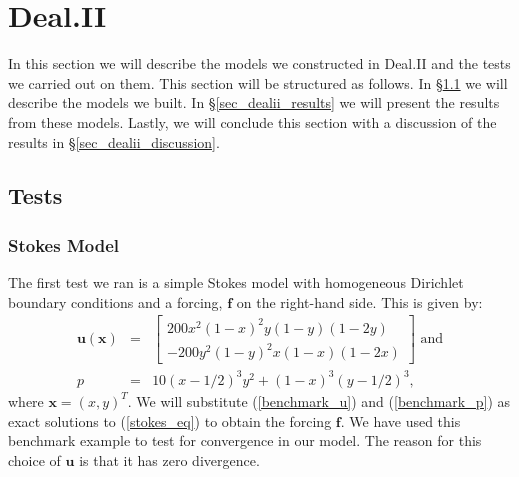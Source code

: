 \documentclass[12pt,a4paper]{article}
\theoremstyle{definition}
\begin{document}
\section{Deal.II}\label{sec_numerics}
In this section we will describe the models we constructed in Deal.II and the tests we carried out on them.  This section will be structured as follows.  In  \S \ref{sec_dealii_tests} we will describe the models we built.  In \S \ref{sec_dealii_results} we will present the results from these models.  Lastly, we will conclude this section with a discussion of the results in \S \ref{sec_dealii_discussion}.  
\subsection{Tests}\label{sec_dealii_tests}
\subsubsection{Stokes Model}\label{sec_test_stokes}
The first test we ran is a simple Stokes model with homogeneous Dirichlet boundary conditions and a forcing, $\textbf{f}$ on the right-hand side.  This is given by:
\begin{eqnarray}
\label{benchmark_u}
\textbf{u}\left(\textbf{x}\right)&=&\begin{bmatrix}
200x^2\left(1-x\right)^2y\left(1-y\right)\left(1-2y\right)  \\
-200y^2\left(1-y\right)^2x\left(1-x\right)\left(1-2x\right)  
\end{bmatrix} \text{ and}\\\label{benchmark_p}
p &=& 10\left(x-1/2\right)^3y^2+\left(1-x\right)^3\left(y-1/2\right)^3,
\end{eqnarray}
where $\textbf{x}=\left(x,y\right)^T$.    We will substitute (\ref{benchmark_u}) and (\ref{benchmark_p}) as exact solutions to (\ref{stokes_eq}) to obtain the forcing $\textbf{f}$.  We have used this benchmark example to test for convergence in our model.  The reason for this choice of $\textbf{u}$ is that it has zero divergence.
\end{document}
